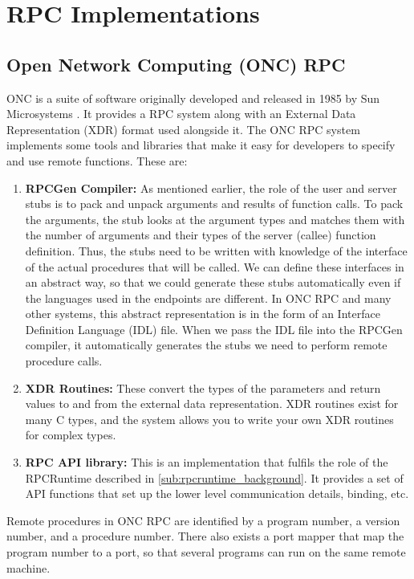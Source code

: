 \section{RPC Implementations} %
\label{sec:rpc_implementations}

\subsection{Open Network Computing (ONC) RPC} %
\label{sub:oncrpc_intro}

ONC is a suite of software originally developed and released in 1985 by Sun Microsystems \cite{stevens2004unix}. It provides a RPC system along with an External Data Representation (XDR) format used alongside it. The ONC RPC system implements some tools and libraries that make it easy for developers to specify and use remote functions. These are:

\begin{enumerate}
	\item \textbf{RPCGen Compiler:} As mentioned earlier, the role of the user and server stubs is to pack and unpack arguments and results of function calls. To pack the arguments, the stub looks at the argument types and matches them with the number of arguments and their types of the server (callee) function definition. Thus, the stubs need to be written with knowledge of the interface of the actual procedures that will be called. We can define these interfaces in an abstract way, so that we could generate these stubs automatically even if the languages used in the endpoints are different. In ONC RPC and many other systems, this abstract representation is in the form of an Interface Definition Language (IDL) file. When we pass the IDL file into the RPCGen compiler, it automatically generates the stubs we need to perform remote procedure calls.
	\item \textbf{XDR Routines:} These convert the types of the parameters and return values to and from the external data representation. XDR routines exist for many C types, and the system allows you to write your own XDR routines for complex types.
	\item \textbf{RPC API library:} This is an implementation that fulfils the role of the RPCRuntime described in \ref{sub:rpcruntime_background}. It provides a set of API functions that set up the lower level communication details, binding, etc.
\end{enumerate}

Remote procedures in ONC RPC are identified by a program number, a version number, and a procedure number. There also exists a port mapper that map the program number to a port, so that several programs can run on the same remote machine. 

